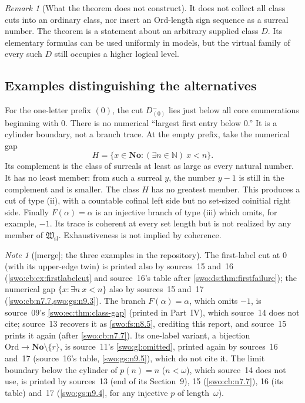 \documentclass[11pt]{article}
\theoremstyle{definition}
\theoremstyle{remark}
\newtheorem{remark}[remark]{Remark}
\newtheorem{note}[note]{Note}
\newcommand{\No}{\mathbf{No}}
\newcommand{\Ord}{\mathrm{Ord}}
\newcommand{\Hsl}{\mathfrak W_{\mathrm{sl}}}
\newcommand{\merge}{\textsf{[merge]}}
\begin{document}
\begin{remark}[What the theorem does not construct]\label{swo:tc:n5.4}
It does not collect all class cuts into an ordinary class, nor insert
an $\Ord$-length sign sequence as a surreal number. The theorem is a
statement about an arbitrary supplied class $D$. Its elementary formulas
can be used uniformly in models, but the virtual family of every such
$D$ still occupies a higher logical level.
\end{remark}

\subsection{Examples distinguishing the alternatives}
For the one-letter prefix $(0)$, the cut $D_{(0)}^-$ lies just below all
core enumerations beginning with $0$. There is no numerical ``largest
first entry below $0$.'' It is a cylinder boundary, not a branch trace.
At the empty prefix, take the numerical gap
\[
 H=\{x\in\No:(\exists n\in\mathbb N)\ x<n\}.
\]
Its complement is the class of surreals at least as large as every
natural number. It has no least member: from such a surreal $y$, the
number $y-1$ is still in the complement and is smaller. The class $H$
has no greatest member. This produces a cut of type (ii), with a
countable cofinal left side but no set-sized coinitial right side.
Finally $F(\alpha)=\alpha$ is an injective branch of type (iii) which
omits, for example, $-1$. Its trace is coherent at every set length but
is not realized by any member of $\Hsl$. Exhaustiveness is not implied
by coherence.

\begin{note}[\merge; the three examples in the repository]\label{swo:viii:note:examples}
The first-label cut at $0$ (with its upper-edge twin) is printed also by
sources~15 and~16 (\cref{swo:cb:ex:firstlabelcut} and source~16's table after
\cref{swo:ds:thm:firstfailure}); the numerical gap
$\{x:\exists n\ x<n\}$ also by sources~15 and~17 (\cref{swo:cb:n7.7,swo:gs:n9.3}).
The branch $F(\alpha)=\alpha$, which omits $-1$, is source~09's
\cref{swo:ec:thm:class-gap} (printed in Part~IV), which source~14 does not
cite; source~13 recovers it as \cref{swo:fs:n8.5}, crediting this report,
and source~15 prints it again (after \cref{swo:cb:n7.7}). Its one-label
variant, a bijection $\Ord\to\No\setminus\{r\}$, is source~11's
\cref{swo:gl:omitted}, printed again by sources~16 and~17 (source~16's
table, \cref{swo:gs:n9.5}), which do not cite it. The limit boundary below
the cylinder of $p(n)=n$ ($n<\omega$), which source~14 does not use, is
printed by sources~13 (end of its Section~9), 15 (\cref{swo:cb:n7.7}),
16 (its table) and~17 (\cref{swo:gs:n9.4}, for any injective $p$ of
length~$\omega$).
\end{note}
\end{document}
